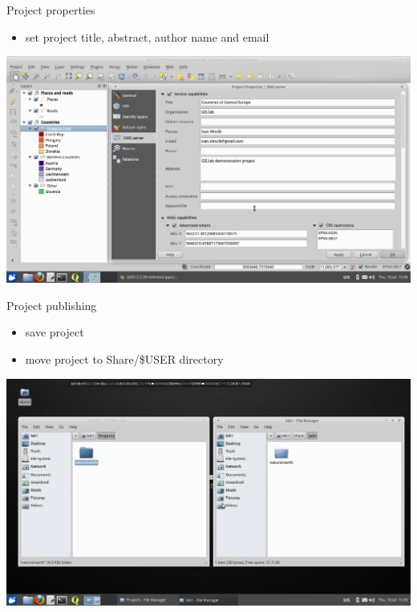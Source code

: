 \documentclass[12pt]{beamer}
\begin{document}
\begin{frame}{Project properties}
	\begin{itemize}
		\item set project title, abstract, author name and email
	\end{itemize}
	\begin{center}
		\includegraphics[keepaspectratio=true,height=0.6\textheight]{images/rapid-gis-deployment/project-properties.png}
	\end{center}
\end{frame}


\begin{frame}{Project publishing}
	\begin{itemize}
		\item save project
		\item move project to Share/\$USER directory
	\end{itemize}
	\begin{center}
		\includegraphics[keepaspectratio=true,height=0.6\textheight]{images/rapid-gis-deployment/project-share-directory.png}
	\end{center}
\end{frame}
\end{document}
